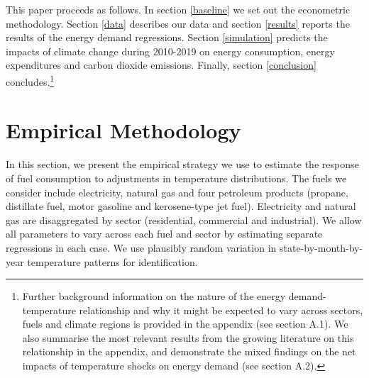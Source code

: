 \documentclass[11pt]{article}
\begin{document}
This paper proceeds as follows. In section \ref{baseline} we set out the econometric methodology. Section \ref{data} describes our data and section \ref{results} reports the results of the energy demand regressions. Section \ref{simulation} predicts the impacts of climate change during 2010-2019 on energy consumption, energy expenditures and carbon dioxide emissions. Finally, section \ref{conclusion} concludes.\footnote{ Further background information on the nature of the energy demand-temperature relationship and why it might be expected to vary across sectors, fuels and climate regions is provided in the appendix (see section A.1). We also summarise the most relevant results from the growing literature on this relationship in the appendix, and demonstrate the mixed findings on the net impacts of temperature shocks on energy demand (see section A.2).} 

\section{Empirical Methodology \label{baseline}}

In this section, we present the empirical strategy we use to estimate the response of fuel consumption to adjustments in temperature distributions. The fuels we consider include electricity, natural gas and four petroleum products (propane, distillate fuel, motor gasoline and kerosene-type jet fuel). Electricity and natural gas are disaggregated by sector (residential, commercial and industrial). We allow all parameters to vary across each fuel and sector by estimating separate regressions in each case. We use plausibly random variation in state-by-month-by-year temperature patterns for identification.
\end{document}
